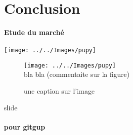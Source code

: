 \documentclass{article}
\begin{document}
\section*{Conclusion}

\paragraph{Etude du march\'e}
\begin{center}
	\texttt{[image: ../../Images/pupy]}
\end{center}
\begin{figure}[ht]
	\centering
	\texttt{[image: ../../Images/pupy]}\\
	bla bla (commentaite sur la figure)
	\caption{une caption sur l'image}
	\label{key}
	
\end{figure}
\begin{frame}
	slide
\end{frame}


\begin{center}
	\begin{minipage}{10cm}
		
	\end{minipage}
\end{center}
\paragraph{pour gitgup}
\end{document}
